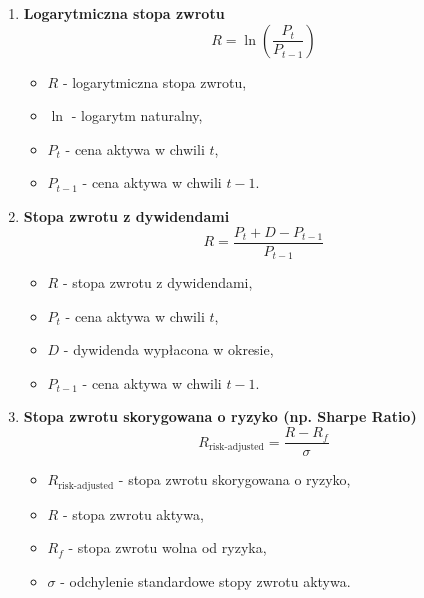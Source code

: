 \begin{enumerate}
\begin{enumerate}
 \item \textbf{Logarytmiczna stopa zwrotu}
 \begin{equation}
 R = \ln\left(\frac{P_t}{P_{t-1}}\right)
 \end{equation}
 \begin{itemize}
  \item \( R \) - logarytmiczna stopa zwrotu,
  \item \( \ln \) - logarytm naturalny,
  \item \( P_t \) - cena aktywa w chwili \( t \),
  \item \( P_{t-1} \) - cena aktywa w chwili \( t-1 \).
 \end{itemize}

 \item \textbf{Stopa zwrotu z dywidendami}
 \begin{equation}
 R = \frac{P_t + D - P_{t-1}}{P_{t-1}}
 \end{equation}
 \begin{itemize}
  \item \( R \) - stopa zwrotu z dywidendami,
  \item \( P_t \) - cena aktywa w chwili \( t \),
  \item \( D \) - dywidenda wypłacona w okresie,
  \item \( P_{t-1} \) - cena aktywa w chwili \( t-1 \).
 \end{itemize}

 \item \textbf{Stopa zwrotu skorygowana o ryzyko (np. Sharpe Ratio)}
 \begin{equation}
 R_{\text{risk-adjusted}} = \frac{R - R_f}{\sigma}
 \end{equation}
 \begin{itemize}
  \item \( R_{\text{risk-adjusted}} \) - stopa zwrotu skorygowana o ryzyko,
  \item \( R \) - stopa zwrotu aktywa,
  \item \( R_f \) - stopa zwrotu wolna od ryzyka,
  \item \( \sigma \) - odchylenie standardowe stopy zwrotu aktywa.
 \end{itemize}
\end{enumerate}


\end{enumerate}
